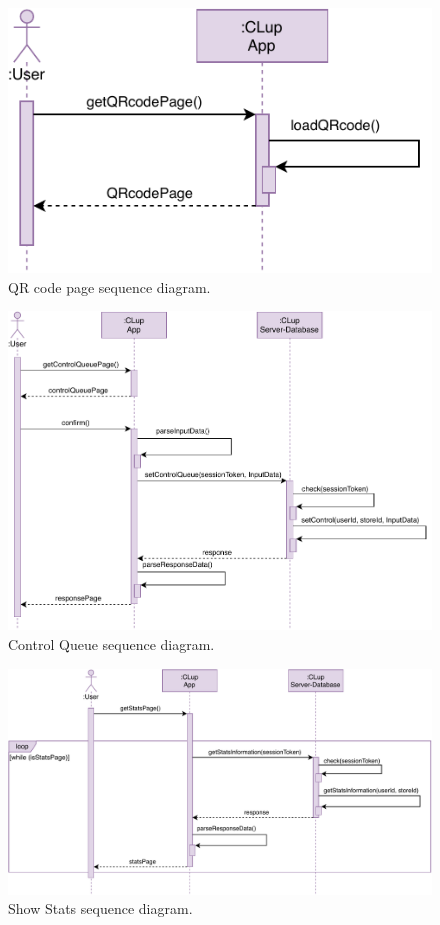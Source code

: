\begin{figure}[H]
    \centering
    \includegraphics[width=1.0\textwidth]{images/getQRcodePage_sequence_diagram.pdf}
    \caption{QR code page sequence diagram.}
\end{figure}

\begin{figure}[H]
    \centering
    \includegraphics[width=1.0\textwidth]{images/getControlQueuePage_sequence_diagram.pdf}
    \caption{Control Queue sequence diagram.}
\end{figure}

\begin{figure}[H]
    \centering
    \includegraphics[width=1.0\textwidth]{images/getShowStatsPage_sequence_diagram.pdf}
    \caption{Show Stats sequence diagram.}
\end{figure}

